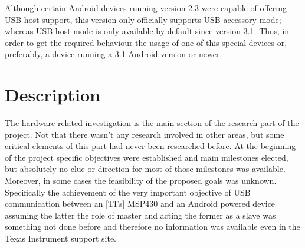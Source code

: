 			Although certain Android devices running version 2.3 were capable of offering USB host support, this
			version only officially supports USB accessory mode; whereas USB host mode is only available by
			default since version 3.1. Thus, in order to get the required behaviour the usage of one of this
			special devices or, preferably, a device running a 3.1 Android version or newer.

	\section{Description}



	The hardware related investigation is the main section of the research part of the project. Not that there wasn't any research involved in other areas, but some critical elements of this part had never been researched before. 
	At the beginning of the project specific objectives were established and main milestones elected, but absolutely no clue or direction for most of those milestones was available.
	Moreover, in some cases the feasibility of the proposed goals was unknown. Specifically the achievement of the very important objective of USB communication between an [TI's] MSP430 %
	and an Android powered device assuming the latter the role of master and acting the former as a slave was something not done before and therefore no information was available  even in the Texas Instrument support site.\\


